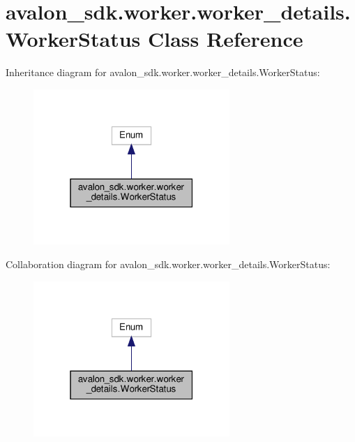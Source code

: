 \hypertarget{classavalon__sdk_1_1worker_1_1worker__details_1_1WorkerStatus}{}\section{avalon\+\_\+sdk.\+worker.\+worker\+\_\+details.\+Worker\+Status Class Reference}
\label{classavalon__sdk_1_1worker_1_1worker__details_1_1WorkerStatus}


Inheritance diagram for avalon\+\_\+sdk.\+worker.\+worker\+\_\+details.\+Worker\+Status\+:
\nopagebreak
\begin{figure}[H]
\begin{center}
\leavevmode
\includegraphics[width=211pt]{classavalon__sdk_1_1worker_1_1worker__details_1_1WorkerStatus__inherit__graph}
\end{center}
\end{figure}


Collaboration diagram for avalon\+\_\+sdk.\+worker.\+worker\+\_\+details.\+Worker\+Status\+:
\nopagebreak
\begin{figure}[H]
\begin{center}
\leavevmode
\includegraphics[width=211pt]{classavalon__sdk_1_1worker_1_1worker__details_1_1WorkerStatus__coll__graph}
\end{center}
\end{figure}
